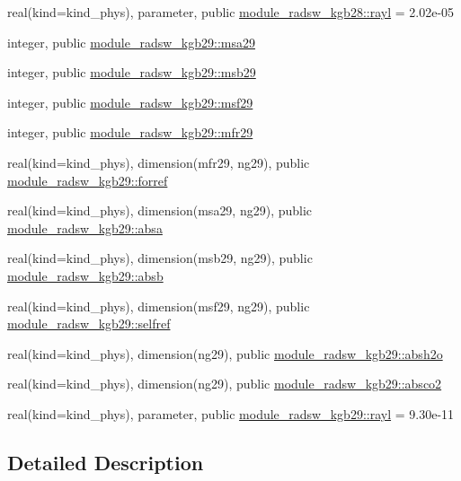\begin{DoxyCompactItemize}
\item 
real(kind=kind\+\_\+phys), parameter, public \hyperlink{group__module__radsw__main_gaf3641febf88e97741b2cd86a56eda843}{module\+\_\+radsw\+\_\+kgb28\+::rayl} = 2.\+02e-\/05
\item 
integer, public \hyperlink{namespacemodule__radsw__kgb29_adbee6e5d3b3efc437ff8815e42962b92}{module\+\_\+radsw\+\_\+kgb29\+::msa29}
\item 
integer, public \hyperlink{group__module__radsw__main_gadd8e18a273d5fa133f22fb47c4d722da}{module\+\_\+radsw\+\_\+kgb29\+::msb29}
\item 
integer, public \hyperlink{group__module__radsw__main_gace849342fcb0d18d825318a2ee26ce0e}{module\+\_\+radsw\+\_\+kgb29\+::msf29}
\item 
integer, public \hyperlink{group__module__radsw__main_ga866ce18e53b84d75d51dd8c6a999ee7b}{module\+\_\+radsw\+\_\+kgb29\+::mfr29}
\item 
real(kind=kind\+\_\+phys), dimension(mfr29, ng29), public \hyperlink{group__module__radsw__main_ga6e4d495b4588d3c794047e71497661a0}{module\+\_\+radsw\+\_\+kgb29\+::forref}
\item 
real(kind=kind\+\_\+phys), dimension(msa29, ng29), public \hyperlink{group__module__radsw__main_ga1132fd19edc0312f6bcc905619f3bdfd}{module\+\_\+radsw\+\_\+kgb29\+::absa}
\item 
real(kind=kind\+\_\+phys), dimension(msb29, ng29), public \hyperlink{group__module__radsw__main_gac9fb794bc4e4a02964b5e5d1431c31c3}{module\+\_\+radsw\+\_\+kgb29\+::absb}
\item 
real(kind=kind\+\_\+phys), dimension(msf29, ng29), public \hyperlink{group__module__radsw__main_ga468e2dd6001734d10784c8fb7b5df4e3}{module\+\_\+radsw\+\_\+kgb29\+::selfref}
\item 
real(kind=kind\+\_\+phys), dimension(ng29), public \hyperlink{group__module__radsw__main_gacab70725ca7faf002f04306fe1798e02}{module\+\_\+radsw\+\_\+kgb29\+::absh2o}
\item 
real(kind=kind\+\_\+phys), dimension(ng29), public \hyperlink{group__module__radsw__main_gaa9a57e32dfbb8979478aa8c931ff0e2d}{module\+\_\+radsw\+\_\+kgb29\+::absco2}
\item 
real(kind=kind\+\_\+phys), parameter, public \hyperlink{group__module__radsw__main_gabc0a41a10d73674e124115fe0511cc23}{module\+\_\+radsw\+\_\+kgb29\+::rayl} = 9.\+30e-\/11
\end{DoxyCompactItemize}


\subsection{Detailed Description}


